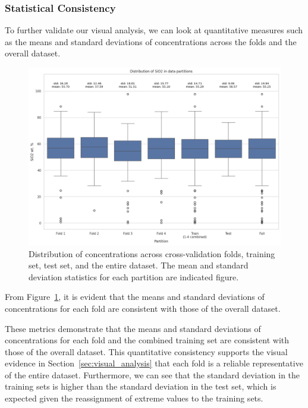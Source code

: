 \subsubsection{Statistical Consistency}
To further validate our visual analysis, we can look at quantitative measures such as the means and standard deviations of  concentrations across the folds and the overall dataset.

\begin{figure}[htbp]
    \centering
    \includegraphics[width=\textwidth]{images/distribution_plot.png}
    \caption{Distribution of  concentrations across cross-validation folds, training set, test set, and the entire dataset. The mean and standard deviation statistics for each partition are indicated figure.}
    \label{fig:siO2_distribution}
\end{figure}

From Figure~\ref{fig:siO2_distribution}, it is evident that the means and standard deviations of  concentrations for each fold are consistent with those of the overall dataset.

These metrics demonstrate that the means and standard deviations of  concentrations for each fold and the combined training set are consistent with those of the overall dataset.
This quantitative consistency supports the visual evidence in Section~\ref{sec:visual_analysis} that each fold is a reliable representative of the entire dataset.
Furthermore, we can see that the standard deviation in the training sets is higher than the standard deviation in the test set, which is expected given the reassignment of extreme values to the training sets.

